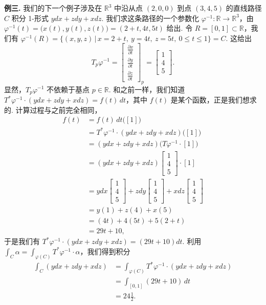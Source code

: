 \textbf{例三.} 我们的下一个例子涉及在 $\mathbb{R}^3$ 中沿从点 $(2,0,0)$ 到点 $(3,4,5)$ 的直线路径 $C$ 积分 1-形式 $ydx+zdy+xdz$. 我们求这条路径的一个参数化 $\varphi^{-1}:\mathbb{R}\to\mathbb{R}^3$，由 $\varphi^{-1}(t)=\bigl(x(t),y(t),z(t)\bigr)=(2+t,4t,5t)$ 给出. 令 $R=[0,1]\subset\mathbb{R}$，我们有 $\varphi^{-1}(R)=\bigl\{(x,y,z)\,\bigl|\,x=2+t,\ y=4t,\ z=5t,\ 0\leq t\leq 1\bigr\}=C$. 这给出
\[
T_p\varphi^{-1}=\begin{bmatrix}\frac{\partial x}{\partial t}\\\frac{\partial y}{\partial t}\\\frac{\partial z}{\partial t}\end{bmatrix}_p=\begin{bmatrix}1\\4\\5\end{bmatrix}.
\]
显然，$T_p\varphi^{-1}$ 不依赖于基点 $p\in\mathbb{R}$. 和之前一样，我们知道 $T^*\varphi^{-1}\cdot(ydx+zdy+xdz)=f(t)\,dt$，其中 $f(t)$ 是某个函数，正是我们想求的. 计算过程与之前完全相同，
\begin{align*}
f(t)&=f(t)\,dt\bigl([1]\bigr)\\
&=T^*\varphi^{-1}\cdot(ydx+zdy+xdz)\bigl([1]\bigr)\\
&=(ydx+zdy+xdz)\bigl(T\varphi^{-1}\cdot[1]\bigr)\\
&=(ydx+zdy+xdz)\begin{bmatrix}1\\4\\5\end{bmatrix}\cdot[1]\\
&=ydx\begin{bmatrix}1\\4\\5\end{bmatrix}+zdy\begin{bmatrix}1\\4\\5\end{bmatrix}+xdz\begin{bmatrix}1\\4\\5\end{bmatrix}\\
&=y(1)+z(4)+x(5)\\
&=(4t)+4(5t)+5(2+t)\\
&=29t+10,
\end{align*}
于是我们有 $T^*\varphi^{-1}\cdot(ydx+zdy+xdz)=(29t+10)dt$. 利用 $\int_C\alpha=\int_{\varphi(C)}T^*\varphi^{-1}\cdot\alpha$，我们得到积分
\begin{align*}
\int_C(ydx+zdy+xdz)
&=\int_{\varphi(C)}T^*\varphi^{-1}\cdot(ydx+zdy+xdz)\\
&=\int_{[0,1]}(29t+10)\,dt\\
&=24\frac{1}{2}.
\end{align*}

